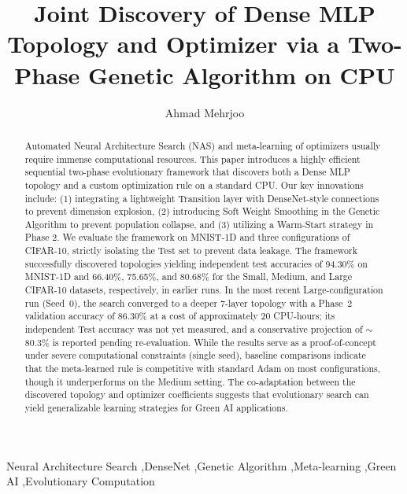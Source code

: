 \documentclass[preprint,12pt,review]{elsarticle}
\begin{document}
\begin{frontmatter}

\title{Joint Discovery of Dense MLP Topology and Optimizer via a Two-Phase Genetic Algorithm on CPU}

\author[1]{Ahmad Mehrjoo}


\begin{abstract}
Automated Neural Architecture Search (NAS) and meta-learning of optimizers usually require immense computational resources. This paper introduces a highly efficient sequential two-phase evolutionary framework that discovers both a Dense MLP topology and a custom optimization rule on a standard CPU. Our key innovations include: (1) integrating a lightweight Transition layer with DenseNet-style connections to prevent dimension explosion, (2) introducing Soft Weight Smoothing in the Genetic Algorithm to prevent population collapse, and (3) utilizing a Warm-Start strategy in Phase 2. We evaluate the framework on MNIST-1D and three configurations of CIFAR-10, strictly isolating the Test set to prevent data leakage. The framework successfully discovered topologies yielding independent test accuracies of 94.30\% on MNIST-1D and 66.40\%, 75.65\%, and 80.68\% for the Small, Medium, and Large CIFAR-10 datasets, respectively, in earlier runs. In the most recent Large-configuration run (Seed~0), the search converged to a deeper 7-layer topology with a Phase~2 validation accuracy of 86.30\% at a cost of approximately 20 CPU-hours; its independent Test accuracy was not yet measured, and a conservative projection of $\sim$80.3\% is reported pending re-evaluation. While the results serve as a proof-of-concept under severe computational constraints (single seed), baseline comparisons indicate that the meta-learned rule is competitive with standard Adam on most configurations, though it underperforms on the Medium setting. The co-adaptation between the discovered topology and optimizer coefficients suggests that evolutionary search can yield generalizable learning strategies for Green AI applications.
\end{abstract}

\begin{keyword}
Neural Architecture Search \sep DenseNet \sep Genetic Algorithm \sep Meta-learning \sep Green AI \sep Evolutionary Computation
\end{keyword}

\end{frontmatter}
\end{document}
